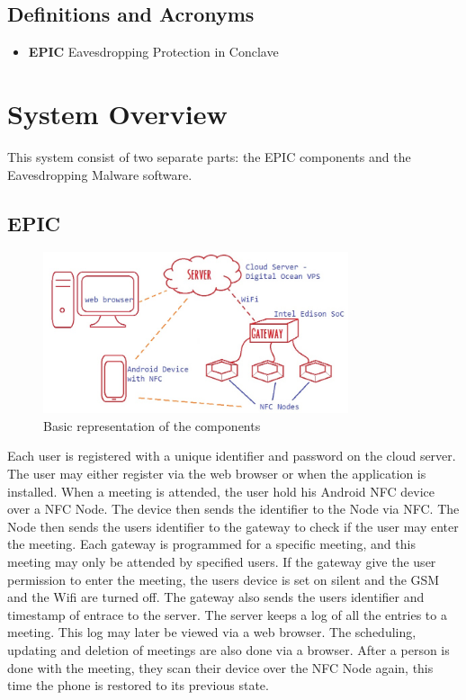 \documentclass[a4paper,12pt,titlepage]{article}
\begin{document}
	\subsection{Definitions and Acronyms}
		\begin{itemize}
			\item\textbf{ EPIC} Eavesdropping Protection in Conclave
		\end{itemize}
\newpage\section{System Overview}

 This system consist of two separate parts: the EPIC components and the Eavesdropping Malware software.
\subsection{EPIC}
\begin{figure}[h!]
 			 \centering
			  \includegraphics[width=0.8\textwidth]{Overview}
		 	 \caption{Basic representation of the components}
		\end{figure}
Each user is registered with a unique identifier and password on the cloud server. The user may either register via the web browser or when the application is installed. When a meeting is attended, the user hold his Android NFC device over a NFC Node. The device then sends the identifier to the Node via NFC. The Node then sends the users identifier to the gateway to check if the user may enter the meeting. Each gateway is programmed for a specific meeting, and this meeting may only be attended by specified users. If the gateway give the user permission to enter the meeting, the users device is set on silent and the GSM and the Wifi are turned off. The gateway also sends the users identifier and timestamp of entrace to the server. The server keeps a log of all the entries to a meeting. This log may later be viewed via a web browser. The scheduling, updating and deletion of meetings are also done via a browser. After a person is done with the meeting, they scan their device over the NFC Node again, this time the phone is restored to its previous state.
\end{document}
